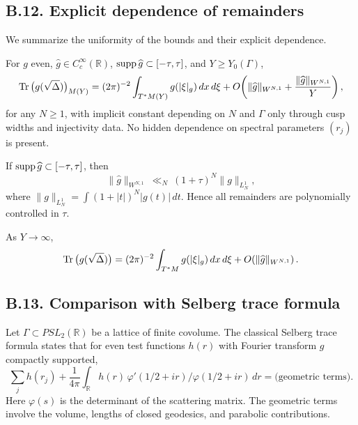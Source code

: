 \subsection*{B.12. Explicit dependence of remainders}

\noindent
We summarize the uniformity of the bounds and their explicit dependence.

\begin{proposition}\label{prop:B.12-remainders}
For $g$ even, $\widehat g\in C_c^\infty(\mathbb R)$, $\operatorname{supp} \widehat g\subset [-\tau,\tau]$,
and $Y\ge Y_0(\Gamma)$,
\[
\operatorname{Tr}\big(g(\sqrt\Delta)\big)_{M(Y)}
= (2\pi)^{-2}\int_{T^*M(Y)} g(|\xi|_g)\,dx\,d\xi + O\!\left(\|\widehat g\|_{W^{N,1}} + \frac{\|\widehat g\|_{W^{N,1}}}{Y}\right),
\]
for any $N\ge 1$, with implicit constant depending on $N$ and $\Gamma$ only through cusp widths
and injectivity data. No hidden dependence on spectral parameters $(r_j)$ is present.
\end{proposition}

\begin{remark}\label{rmk:B.12-tau}
If $\operatorname{supp}\widehat g\subset[-\tau,\tau]$, then
\[
\|\widehat g\|_{W^{N,1}} \ \ll_N \ (1+\tau)^N \|g\|_{L^1_N},
\]
where $\|g\|_{L^1_N}=\int (1+|t|)^N |g(t)|\,dt$.
Hence all remainders are polynomially controlled in $\tau$.
\end{remark}

\begin{corollary}\label{cor:B.12-asympt}
As $Y\to\infty$,
\[
\operatorname{Tr}\big(g(\sqrt\Delta)\big)
= (2\pi)^{-2}\int_{T^*M} g(|\xi|_g)\,dx\,d\xi + O\!\left(\|\widehat g\|_{W^{N,1}}\right).
\]
\end{corollary}

\subsection*{B.13. Comparison with Selberg trace formula}

\noindent
Let $\Gamma\subset PSL_2(\mathbb R)$ be a lattice of finite covolume. The classical
Selberg trace formula states that for even test functions $h(r)$ with Fourier
transform $g$ compactly supported,
\[
\sum_j h(r_j) + \frac{1}{4\pi}\int_{\mathbb R} h(r)\,\varphi'(1/2+ir)/\varphi(1/2+ir)\,dr
= \text{(geometric terms)}.
\]
Here $\varphi(s)$ is the determinant of the scattering matrix. The geometric terms
involve the volume, lengths of closed geodesics, and parabolic contributions.

